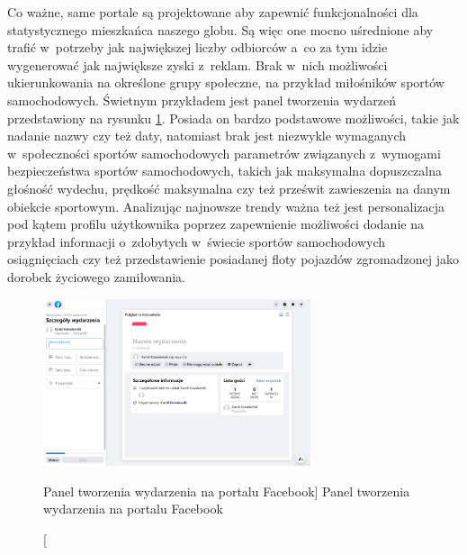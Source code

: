 \documentclass[../Kamil_Kowalewski_Main.tex]{subfiles}
\begin{document}
{{        Co ważne, same portale są projektowane aby zapewnić funkcjonalności dla
        statystycznego mieszkańca naszego globu. Są więc one mocno uśrednione aby
        trafić w~potrzeby jak największej liczby odbiorców a~co za tym idzie
        wygenerować jak największe zyski z~reklam. Brak w~nich możliwości ukierunkowania
        na określone grupy społeczne, na przykład miłośników sportów samochodowych.
        Świetnym przykładem jest panel tworzenia wydarzeń przedstawiony na rysunku
        \ref{chapter2:wprowadzenie_sporty:analiza_aplikacji:fb_event_form}. Posiada on
        bardzo podstawowe możliwości, takie jak nadanie nazwy czy też daty, natomiast
        brak jest niezwykle wymaganych w~społeczności sportów samochodowych parametrów
        związanych z~wymogami bezpieczeństwa sportów samochodowych, takich jak maksymalna
        dopuszczalna głośność wydechu, prędkość maksymalna czy też prześwit zawieszenia
        na danym obiekcie sportowym. Analizując najnowsze trendy ważna też jest
        personalizacja pod kątem profilu użytkownika poprzez zapewnienie możliwości dodanie
        na przykład informacji o~zdobytych w~świecie sportów samochodowych osiągnięciach czy
        też przedstawienie posiadanej floty pojazdów zgromadzonej jako dorobek życiowego
        zamiłowania.

        \begin{figure}[H]
            \centering
            \includegraphics[width=0.7\textwidth, keepaspectratio]
            {img/chapter2/fb_event_form.png}
            \caption
            [Panel tworzenia wydarzenia na portalu Facebook]
            {Panel tworzenia wydarzenia na portalu Facebook}
            \label{chapter2:wprowadzenie_sporty:analiza_aplikacji:fb_event_form}
        \end{figure}
    }

}
\end{document}

